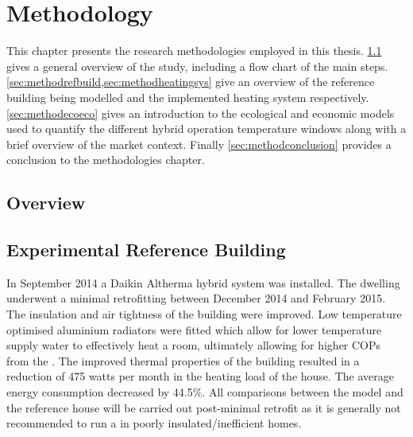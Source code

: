 \chapter{Methodology}\label{ch:method} 

This chapter presents the research methodologies employed in this thesis. \cref{sec:methodoverview} gives a general overview of the study, including a flow chart of the main steps. \cref{sec:methodrefbuild,sec:methodheatingsys} give an overview of the reference building being modelled and the implemented heating system respectively. \cref{sec:methodecoeco} gives an introduction to the ecological and economic models used to quantify the different hybrid operation temperature windows along with a brief overview of the market context. Finally \cref{sec:methodconclusion} provides a conclusion to the methodologies chapter.

\section{Overview} \label{sec:methodoverview}



\section{Experimental Reference Building}\label{sec:methodrefbuild}
In September 2014 a Daikin Altherma hybrid \HP system was installed. The dwelling underwent a minimal retrofitting between December 2014 and February 2015. The insulation and air tightness of the building were improved. Low temperature optimised aluminium radiators were fitted which allow for lower temperature supply water to effectively heat a room, ultimately allowing for higher \acp{COP} from the \HP. The improved thermal properties of the building resulted in a reduction of 475 watts per month in the heating load of the house. The average energy consumption decreased by 44.5\%. All comparisons between the model and the reference house will be carried out post-minimal retrofit as it is generally not recommended to run a \HP in poorly insulated/inefficient homes. 
